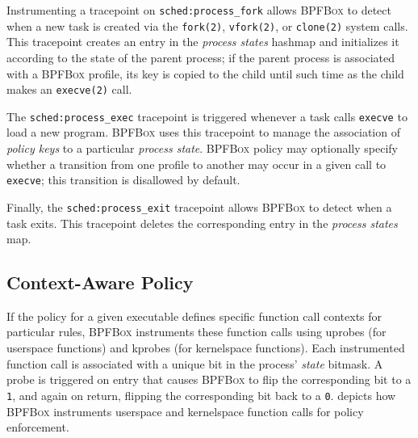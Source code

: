 \documentclass[
  fontsize=12pt,
  titlepage=firstiscover,
  paper=letter,
oneside,
  cleardoublepage=plain,
  parskip=half-,
  DIV=10,
  parindent,
  appendixprefix,
  chapterprefix,
  listof=totoc,
]{scrbook}
\newcommand{\bpfbox}{\textsc{BPFBox}}
\begin{document}
Instrumenting a tracepoint on \texttt{sched:process\_fork} allows \bpfbox{} to
detect when a new task is created via the \texttt{fork(2)}, \texttt{vfork(2)}, or
\texttt{clone(2)} system calls. This tracepoint creates an entry in the \textit{process
states} hashmap and initializes it according to the state of the parent process; if the
parent process is associated with a \bpfbox{} profile, its key is copied to the child
until such time as the child makes an \texttt{execve(2)} call.

The \texttt{sched:process\_exec} tracepoint is triggered whenever a task calls
\texttt{execve} to load a new program.  \bpfbox{} uses this tracepoint to manage the
association of \textit{policy keys} to a particular \textit{process state}.  \bpfbox{}
policy may optionally specify whether a transition from one profile to another may occur
in a given call to \texttt{execve}; this transition is disallowed by default.

Finally, the \texttt{sched:process\_exit} tracepoint allows \bpfbox{} to detect when
a task exits. This tracepoint deletes the corresponding entry in the \textit{process
states} map.

\subsection{Context-Aware Policy}
\label{ss:bpfbox-context-aware}

If the policy for a given executable defines specific function call contexts for
particular rules, \bpfbox{} instruments these function calls using uprobes (for userspace
functions) and kprobes (for kernelspace functions). Each instrumented function call is
associated with a unique bit in the process' \textit{state} bitmask.  A probe is triggered
on entry that causes \bpfbox{} to flip the corresponding bit to a \texttt{1}, and again on
return, flipping the corresponding bit back to a \texttt{0}.
 depicts how \bpfbox{} instruments userspace and
kernelspace function calls for policy enforcement.
\end{document}
